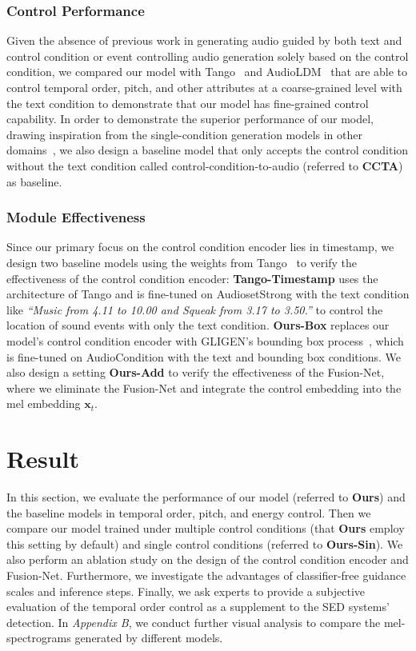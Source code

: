 \documentclass[letterpaper]{article} %
\begin{document}
\subsubsection{Control Performance} Given the absence of previous work in generating audio guided by both text and control condition or event controlling audio generation solely based on the control condition, we compared our model with Tango~\cite{ghosal2023tango} and AudioLDM~\cite{liu2023audioldm} that are able to control temporal order, pitch, and other attributes at a coarse-grained level with the text condition to demonstrate that our model has fine-grained control capability. In order to demonstrate the superior performance of our model, drawing inspiration from the single-condition generation models in other domains~\cite{jahn2021highresolutioncs,li2023blip2,radford2020gpt3}, we also design a baseline model that only accepts the control condition without the text condition called control-condition-to-audio (referred to \textbf{CCTA}) as baseline.

\subsubsection{Module Effectiveness} Since our primary focus on the control condition encoder lies in timestamp, we design two baseline models using the weights from Tango~\cite{ghosal2023tango} to verify the effectiveness of the control condition encoder: \textbf{Tango-Timestamp} uses the architecture of Tango and is fine-tuned on AudiosetStrong with the text condition like \textit{``Music from 4.11 to 10.00 and Squeak from 3.17 to 3.50.''} to control the location of sound events with only the text condition. \textbf{Ours-Box} replaces our model's control condition encoder with GLIGEN's bounding box process~\cite{li2023gligen}, which is fine-tuned on AudioCondition with the text and bounding box conditions. We also design a setting \textbf{Ours-Add} to verify the effectiveness of the Fusion-Net, where we eliminate the Fusion-Net and integrate the control embedding into the mel embedding $\mathbf{x}_{t}$.

\section{Result}

In this section, we evaluate the performance of our model (referred to \textbf{Ours}) and the baseline models in temporal order, pitch, and energy control. Then we compare our model trained under multiple control conditions (that \textbf{Ours} employ this setting by default) and single control conditions (referred to \textbf{Ours-Sin}). We also perform an ablation study on the design of the control condition encoder and Fusion-Net. Furthermore, we investigate the advantages of classifier-free guidance scales and inference steps. Finally, we ask experts to provide a subjective evaluation of the temporal order control as a supplement to the SED systems' detection. In \textit{Appendix B}, we conduct further visual analysis to compare the mel-spectrograms generated by different models.
\end{document}
